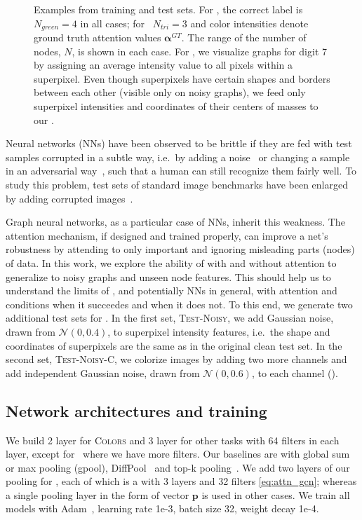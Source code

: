 \begin{figure}[h!]
	\vspace{-10pt}
	\caption{\small Examples from training and test sets. For , the correct label is $N_{green}=4$ in all cases; for \tri~$N_{tri}=3$ and color intensities denote ground truth attention values $\mathbf{\alpha}^{GT}$. The range of the number of nodes, $N$, is shown in each case. For \mnist, we visualize graphs for digit 7 by assigning an average intensity value to all pixels within a superpixel. Even though superpixels have certain shapes and borders between each other (visible only on noisy graphs), we feed only superpixel intensities and coordinates of their centers of masses to our \gnns.}
	\label{fig:test_subsets}
	\vspace{-8pt}
\end{figure}

Neural networks (NNs) have been observed to be brittle if they are fed with test samples corrupted in a subtle way, i.e.~by adding a noise~\citep{dodge2017study} or changing a sample in an adversarial way~\citep{szegedy2013intriguing}, such that a human can still recognize them fairly well. To study this problem, test sets of standard image benchmarks have been enlarged by adding corrupted images~\citep{hendrycks2019benchmarking}.

Graph neural networks, as a particular case of NNs, inherit this weakness. The attention mechanism, if designed and trained properly, can improve a net's robustness by attending to only important and ignoring misleading parts (nodes) of data. In this work, we explore the ability of \gnns with and without attention to generalize to noisy graphs and unseen node features. This should help us to understand the limits of \gnns, and potentially NNs in general, with attention and conditions when it succeedes and when it does not. To this end, we generate two additional test sets for \mnist. In the first set, \textsc{Test-Noisy}, we add Gaussian noise, drawn from $\mathcal{N}(0, 0.4)$, to superpixel intensity features, i.e.~the shape and coordinates of superpixels are the same as in the original clean test set. In the second set, \textsc{Test-Noisy-C}, we colorize images by adding two more channels and add independent Gaussian noise, drawn from $ \mathcal{N}(0, 0.6)$, to each channel (\fig{\ref{fig:test_subsets}}).

\subsection{Network architectures and training}
\label{sec:arch_train}
We build 2 layer \gnns for \textsc{Colors} and 3 layer \gnns for other tasks with 64 filters in each layer, except for \mnist~where we have more filters. Our baselines are \gnns with global sum or max pooling (gpool), DiffPool~\citep{ying2018hierarchical} and top-k pooling~\citep{graphunet2018}. We add two layers of our pooling for \tri, each of which is a \gnn with 3 layers and 32 filters \eqref{eq:attn_gcn}; whereas a single pooling layer in the form of vector $\mathbf{p}$ is used in other cases.
We train all models with Adam~\citep{kingma2014adam}, learning rate 1e-3, batch size 32, weight decay 1e-4.

